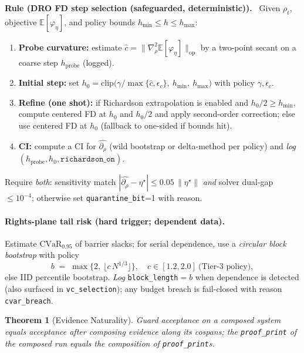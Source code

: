 \documentclass[10pt]{article}
\newenvironment{rulex}[1]{\begin{rulebox}\noindent\textbf{Rule (#1).}\ }{\end{rulebox}}
\newtheorem{theorem}{Theorem}
\begin{document}
\begin{rulex}{DRO FD step selection (safeguarded, deterministic)}
Given $\rho_t$, objective $\mathbb E[\varphi_\eta]$, and policy bounds $h_{\min}\le h\le h_{\max}$:
\begin{enumerate}[leftmargin=*]
  \item \textbf{Probe curvature:} estimate $\widehat c=\|\nabla^2_{\rho}\mathbb E[\varphi_\eta]\|_{\mathrm{op}}$ by a two-point secant on a coarse step $h_{\text{probe}}$ (logged).
  \item \textbf{Initial step:} set $h_0=\mathrm{clip}\big(\gamma/\max\{\widehat c,\epsilon_c\},\ h_{\min},\ h_{\max}\big)$ with policy $\gamma,\epsilon_c$.
  \item \textbf{Refine (one shot):} if Richardson extrapolation is enabled and $h_0/2\ge h_{\min}$, compute centered FD at $h_0$ and $h_0/2$ and apply second-order correction; else use centered FD at $h_0$ (fallback to one-sided if bounds hit).
  \item \textbf{CI:} compute a CI for $\widehat{\partial_\rho}$ (wild bootstrap or delta-method per policy) and \emph{log} $(h_{\text{probe}},h_0,\texttt{richardson\_on})$.
\end{enumerate}
Require \emph{both}: sensitivity match $|\widehat{\partial_\rho}-\eta^\star|\le 0.05\,\|\eta^\star\|$ \emph{and} solver dual-gap $\le 10^{-4}$; otherwise set \texttt{quarantine\_bit}=1 with reason.
\end{rulex}

\paragraph{Rights-plane tail risk (hard trigger; dependent data).}
Estimate $\mathrm{CVaR}_{0.95}$ of barrier slacks; for serial dependence, use a \emph{circular block bootstrap} with policy
\[
b \;=\; \max\{2,\ \lfloor c\,N^{1/3}\rfloor\},\quad c\in[1.2,2.0]\ \text{(Tier-3 policy)},
\]
else IID percentile bootstrap. \emph{Log} \texttt{block\_length}$=b$ when dependence is detected (also surfaced in \texttt{vc\_selection}); any budget breach is fail-closed with reason \texttt{cvar\_breach}.

\begin{theorem}[Evidence Naturality]
\label{thm:evid-naturality}
Guard acceptance on a composed system equals acceptance after composing evidence along its cospans; the
\texttt{proof\_print} of the composed run equals the composition of \texttt{proof\_print}s.
\end{theorem}
\end{document}
